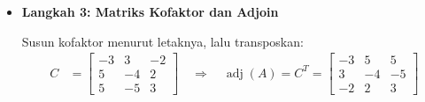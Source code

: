 \documentclass[10pt,a4paper]{article}
\begin{document}
\begin{enumerate}
\begin{enumerate}
\begin{itemize}
Gunakan pola tanda papan catur:
\begin{align}
C_{11} &= +\begin{vmatrix} -1 & 0 \\ 4 & 3 \end{vmatrix} = -3, &
C_{12} &= -\begin{vmatrix} -1 & 0 \\ 2 & 3 \end{vmatrix} = 3, &
C_{13} &= +\begin{vmatrix} -1 & -1 \\ 2 & 4 \end{vmatrix} = -2 \nonumber \\
C_{21} &= -\begin{vmatrix} 5 & 5 \\ 4 & 3 \end{vmatrix} = 5, &
C_{22} &= +\begin{vmatrix} 2 & 5 \\ 2 & 3 \end{vmatrix} = -4, &
C_{23} &= -\begin{vmatrix} 2 & 5 \\ 2 & 4 \end{vmatrix} = 2 \nonumber \\
C_{31} &= +\begin{vmatrix} 5 & 5 \\ -1 & 0 \end{vmatrix} = 5, &
C_{32} &= -\begin{vmatrix} 2 & 5 \\ -1 & 0 \end{vmatrix} = -5, &
C_{33} &= +\begin{vmatrix} 2 & 5 \\ -1 & -1 \end{vmatrix} = 3 \nonumber
\end{align}

\item \textbf{Langkah 3: Matriks Kofaktor dan Adjoin}

Susun kofaktor menurut letaknya, lalu transposkan:
\begin{align}
C &= \begin{bmatrix} -3 & 3 & -2 \\ 5 & -4 & 2 \\ 5 & -5 & 3 \end{bmatrix}
\quad\Rightarrow\quad
\operatorname{adj}(A) = C^T = \begin{bmatrix} -3 & 5 & 5 \\ 3 & -4 & -5 \\ -2 & 2 & 3 \end{bmatrix}
\end{align}


\end{itemize}
\end{enumerate}
\end{enumerate}
\end{document}
